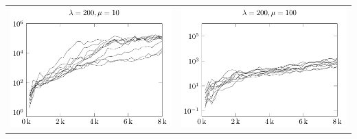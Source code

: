 \begin{tabular}{@{}l@{}l@{}}
\includegraphics[scale=1]{plots/ce_ConstantNoise_l200_o20_all} &
\includegraphics[scale=1]{plots/ce_ConstantNoise_l200_o100_all}
\end{tabular}





